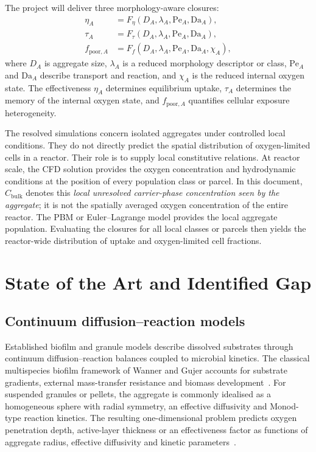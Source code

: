 \documentclass[11pt,a4paper]{article}
\newcommand{\Pe}{\mathrm{Pe}}
\newcommand{\Da}{\mathrm{Da}}
\begin{document}
The project will deliver three morphology-aware closures:
\begin{align}
  \eta_A &=
  F_{\eta}(D_A,\lambda_A,\Pe_A,\Da_A), \label{eq:eta_closure}\\
  \tau_A &=
  F_{\tau}(D_A,\lambda_A,\Pe_A,\Da_A), \label{eq:tau_closure}\\
  f_{\mathrm{poor},A} &=
  F_f(D_A,\lambda_A,\Pe_A,\Da_A,\chi_A), \label{eq:f_closure}
\end{align}
where \(D_A\) is aggregate size, \(\lambda_A\) is a reduced morphology
descriptor or class, \(\Pe_A\) and \(\Da_A\) describe transport and reaction,
and \(\chi_A\) is the reduced internal oxygen state. The effectiveness
\(\eta_A\) determines equilibrium uptake, \(\tau_A\) determines the memory of
the internal oxygen state, and \(f_{\mathrm{poor},A}\) quantifies cellular
exposure heterogeneity.

The resolved simulations concern isolated aggregates under controlled local
conditions. They do not directly predict the spatial distribution of
oxygen-limited cells in a reactor. Their role is to supply local constitutive
relations. At reactor scale, the CFD solution provides the oxygen concentration
and hydrodynamic conditions at the position of every population class or
parcel. In this document, \(C_{\mathrm{bulk}}\) denotes this \emph{local
unresolved carrier-phase concentration seen by the aggregate}; it is not the
spatially averaged oxygen concentration of the entire reactor. The PBM or
Euler--Lagrange model provides the local aggregate population. Evaluating the
closures for all local classes or parcels then yields the reactor-wide
distribution of uptake and oxygen-limited cell fractions.

\section{State of the Art and Identified Gap}

\subsection{Continuum diffusion--reaction models}

Established biofilm and granule models describe dissolved substrates through
continuum diffusion--reaction balances coupled to microbial kinetics. The
classical multispecies biofilm framework of Wanner and Gujer accounts for
substrate gradients, external mass-transfer resistance and biomass
development~\cite{WannerGujer1986}. For suspended granules or pellets, the
aggregate is commonly idealised as a homogeneous sphere with radial symmetry,
an effective diffusivity and Monod-type reaction kinetics. The resulting
one-dimensional problem predicts oxygen penetration depth, active-layer
thickness or an effectiveness factor as functions of aggregate radius,
effective diffusivity and kinetic parameters~\cite{Stewart2003,Wu2008}.
\end{document}
